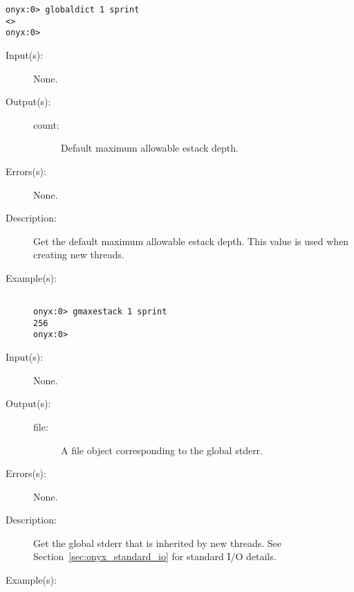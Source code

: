 \begin{description}
\begin{description}
\begin{verbatim}
onyx:0> globaldict 1 sprint
<>
onyx:0>
		\end{verbatim}
	\end{description}
\label{systemdict:gmaxestack}
\item[{\onyxop{--}{gmaxestack}{count}}: ]
	\begin{description}\item[]
	\item[Input(s): ] None.
	\item[Output(s): ]
		\begin{description}\item[]
		\item[count: ]
			Default maximum allowable estack depth.
		\end{description}
	\item[Errors(s): ] None.
	\item[Description: ]
		Get the default maximum allowable estack depth.  This value is
		used when creating new threads.
	\item[Example(s): ]\begin{verbatim}

onyx:0> gmaxestack 1 sprint
256
onyx:0>
		\end{verbatim}
	\end{description}
\label{systemdict:gstderr}
\item[{\onyxop{--}{gstderr}{file}}: ]
	\begin{description}\item[]
	\item[Input(s): ] None.
	\item[Output(s): ]
		\begin{description}\item[]
		\item[file: ]
			A file object corresponding to the global stderr.
		\end{description}
	\item[Errors(s): ] None.
	\item[Description: ]
		Get the global stderr that is inherited by new threads.  See
		Section~\ref{sec:onyx_standard_io} for standard I/O details.
	\item[Example(s): ]\begin{verbatim}


\end{verbatim}
\end{description}
\end{description}
